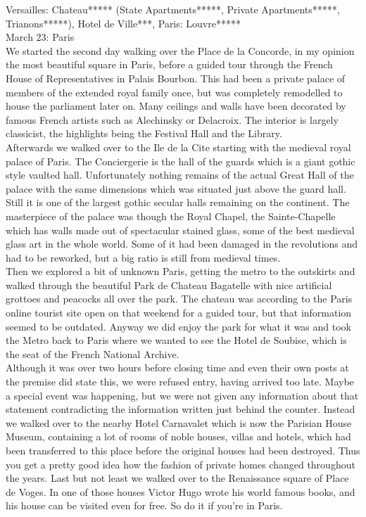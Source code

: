 Versailles: Chateau***** (State Apartments*****, Private Apartments*****, Trianons*****), Hotel de Ville***, Paris: Louvre*****\\

March 23: Paris\\
We started the second day walking over the Place de la Concorde, in my opinion the most beautiful square in Paris, before a guided tour through the French House of Representatives in Palais Bourbon. This had been a private palace of members of the extended royal family once, but was completely remodelled to house the parliament later on. Many ceilings and walls have been decorated by famous French artists such as Alechinsky or Delacroix. The interior is largely classicist, the highlights being the Festival Hall and the Library.\\
 Afterwards we walked over to the Ile de la Cite starting with the medieval royal palace of Paris. The Conciergerie is the hall of the guards which is a giant gothic style vaulted hall. Unfortunately nothing remains of the actual Great Hall of the palace with the same dimensions which was situated just above the guard hall. Still it is one of the largest gothic secular halls remaining on the continent. The masterpiece of the palace was though the Royal Chapel, the Sainte-Chapelle which has walls made out of spectacular stained glass, some of the best medieval glass art in the whole world. Some of it had been damaged in the revolutions and had to be reworked, but a big ratio is still from medieval times.\\
 Then we explored a bit of unknown Paris, getting the metro to the outskirts and walked through the beautiful Park de Chateau Bagatelle with nice artificial grottoes and peacocks all over the park. The chateau was according to the Paris online tourist site open on that weekend for a guided tour, but that information seemed to be outdated. Anyway we did enjoy the park for what it was and took the Metro back to Paris where we wanted to see the Hotel de Soubise, which is the seat of the French National Archive.\\
 Although it was over two hours before closing time and even their own posts at the premise did state this, we were refused entry, having arrived too late. Maybe a special event was happening, but we were not given any information about that statement contradicting the information written just behind the counter. Instead we walked over to the nearby Hotel Carnavalet which is now the Parisian House Museum, containing a lot of rooms of noble houses, villas and hotels, which had been transferred to this place before the original houses had been destroyed. Thus you get a pretty good idea how the fashion of private homes changed throughout the years. Last but not least we walked over to the Renaissance square of Place de Voges. In one of those houses Victor Hugo wrote his world famous books, and his house can be visited even for free. So do it if you're in Paris.\\

